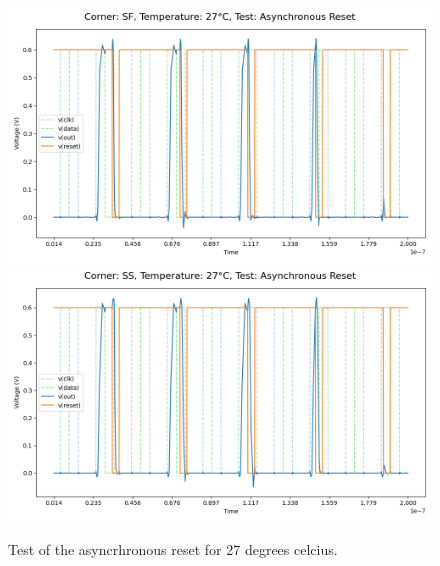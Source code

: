 \begin{figure}[H]
    \vspace{5pt}
    \includegraphics[height= 0.21\textheight]{figures/aimspice/SF/27/W2.csv.png}
    \vspace{5pt}
    \includegraphics[height= 0.21\textheight]{figures/aimspice/SS/27/W2.csv.png}
    \caption{Test of the asyncrhronous reset for 27 degrees celcius.}
    \label{fig:aimspice_W2_27}
\end{figure}

\pagebreak

